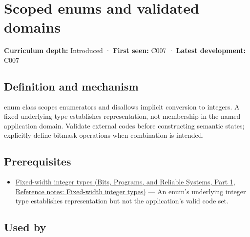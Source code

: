 \hypertarget{appendix-23640fcee147}{}\label{referencestart:appendix-23640fcee147}
\section{Scoped enums and validated domains}\label{appendix-23640fcee147-scoped-enums-and-validated-domains}

\hypertarget{appendix-23640fcee147-scoped-enums-and-validated-domains}{}

\textbf{Curriculum depth:} Introduced · \textbf{First seen:} C007 · \textbf{Latest development:} C007

\begin{allmightroledefinition}

\subsection{Definition and mechanism}\label{appendix-23640fcee147-definition-and-mechanism}

\hypertarget{appendix-23640fcee147-definition-and-mechanism}{}

enum class scopes enumerators and disallows implicit conversion to integers. A fixed underlying type establishes representation, not membership in the named application domain. Validate external codes before constructing semantic states; explicitly define bitmask operations when combination is intended.

\end{allmightroledefinition}

\subsection{Prerequisites}\label{appendix-23640fcee147-prerequisites}

\hypertarget{appendix-23640fcee147-prerequisites}{}

\begin{itemize}
\tightlist
\item
  \href{../01-Bits-Programs-and-Reliable-Systems-P01/main.pdf\#appendix-cc04044b5782}{Fixed-width integer types (Bits, Programs, and Reliable Systems, Part 1, Reference notes: Fixed-width integer types)} --- An enum's underlying integer type establishes representation but not the application's valid code set.
\end{itemize}

\subsection{Used by}\label{appendix-23640fcee147-used-by}

